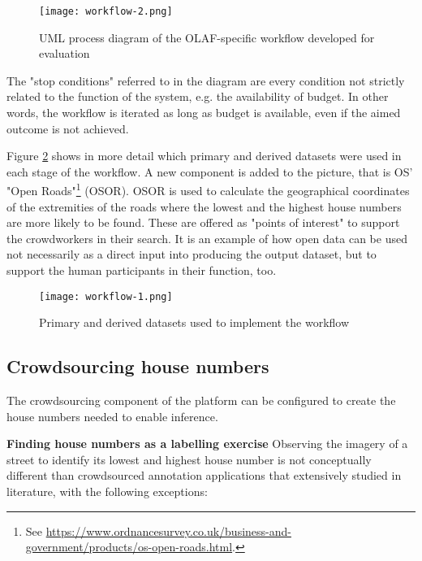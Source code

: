 \begin{figure}
	\texttt{[image: workflow-2.png]}
	\caption{UML process diagram of the OLAF-specific workflow developed for evaluation}
	\label{fig:workflow_2}
\end{figure}

The "stop conditions" referred to in the diagram are every condition not strictly related to the function of the system, e.g. the availability of budget. In other words, the workflow is iterated as long as budget is available, even if the aimed outcome is not achieved. 

Figure \ref{fig:workflow_1} shows in more detail which primary and derived datasets were used in each stage of the workflow. A new component is added to the picture, that is OS' "Open Roads"\footnote{See \url{https://www.ordnancesurvey.co.uk/business-and-government/products/os-open-roads.html}.} (OSOR). OSOR is used to calculate the geographical coordinates of the extremities of the roads where the lowest and the highest house numbers are more likely to be found. These are offered as "points of interest" to support the crowdworkers in their search. It is an example of how open data can be used not necessarily as a direct input into producing the output dataset, but to support the human participants in their function, too.

\begin{figure}
	\texttt{[image: workflow-1.png]}
	\caption{Primary and derived datasets used to implement the workflow}
	\label{fig:workflow_1}
\end{figure}

\subsection{Crowdsourcing house numbers}

The crowdsourcing component of the platform can be configured to create the house numbers needed to enable inference. 

\textbf{Finding house numbers as a labelling exercise} Observing the imagery of a street to identify its lowest and highest house number is not conceptually different than crowdsourced annotation applications that extensively studied in literature, with the following exceptions:

